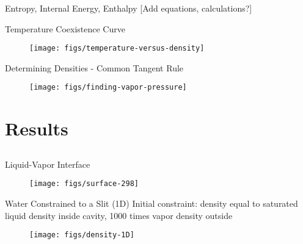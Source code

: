 \documentclass{beamer}
\begin{document}
\begin{frame}[fragile]{Entropy, Internal Energy, Enthalpy}
[Add equations, calculations?]
\end{frame}

\begin{frame}[fragile]{Temperature Coexistence Curve}
\begin{figure}
\begin{center}
\texttt{[image: figs/temperature-versus-density]}
\end{center}
\end{figure}
\end{frame}

\begin{frame}[fragile]{Determining Densities - Common Tangent Rule}
\begin{figure}
\begin{center}
\texttt{[image: figs/finding-vapor-pressure]}
\end{center}
\end{figure}
\end{frame}

\section{Results}
\subsection*{}

\begin{frame}[fragile]{Liquid-Vapor Interface}
\begin{figure}
\begin{center}
\texttt{[image: figs/surface-298]}
\end{center}
\end{figure} 
\end{frame}

\begin{frame}[fragile]{Water Constrained to a Slit (1D)}
Initial constraint: density equal to saturated liquid density inside cavity, 1000 times vapor density outside
\begin{figure}
\begin{center}
\texttt{[image: figs/density-1D]}
\end{center}
\end{figure} 
\end{frame}
\end{document}
